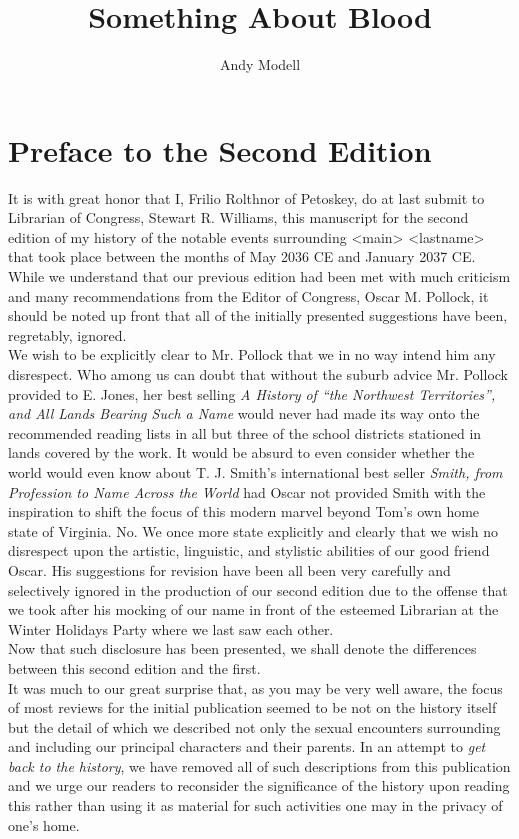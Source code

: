 \documentclass[12pt,openany]{memoir}
\title{Something About Blood}
\author{Andy Modell}
\begin{document}
\maketitle
\chapter*{Preface to the Second Edition}

It is with great honor that I, Frilio Rolthnor of Petoskey, do at last submit to Librarian of Congress, Stewart R. Williams, this manuscript for the second edition of my history of the notable events surrounding <main> <lastname> that took place between the months of May 2036 CE and January 2037 CE.
While we understand that our previous edition had been met with much criticism and many recommendations from the Editor of Congress, Oscar M. Pollock, it should be noted up front that all of the initially presented suggestions have been, regretably, ignored.
\\

We wish to be explicitly clear to Mr. Pollock that we in no way intend him any disrespect.
Who among us can doubt that without the suburb advice Mr. Pollock provided to E. Jones, her best selling \textit{A History of ``the Northwest Territories'', and All Lands Bearing Such a Name} would never had made its way onto the recommended reading lists in all but three of the school districts stationed in lands covered by the work.
It would be absurd to even consider whether the world would even know about T. J. Smith's international best seller \textit{Smith, from Profession to Name Across the World} had Oscar not provided Smith with the inspiration to shift the focus of this modern marvel beyond Tom's own home state of Virginia.
No.
We once more state explicitly and clearly that we wish no disrespect upon the artistic, linguistic, and stylistic abilities of our good friend Oscar.
His suggestions for revision have been all been very carefully and selectively ignored in the production of our second edition due to the offense that we took after his mocking of our name in front of the esteemed Librarian at the Winter Holidays Party where we last saw each other.
\\

Now that such disclosure has been presented, we shall denote the differences between this second edition and the first.
\\

It was much to our great surprise that, as you may be very well aware, the focus of most reviews for the initial publication seemed to be not on the history itself but the detail of which we described not only the sexual encounters surrounding and including our principal characters and their parents.
In an attempt to \textit{get back to the history}, we have removed all of such descriptions from this publication and we urge our readers to reconsider the significance of the history upon reading this rather than using it as material for such activities one may in the privacy of one's home.
\\
\end{document}
